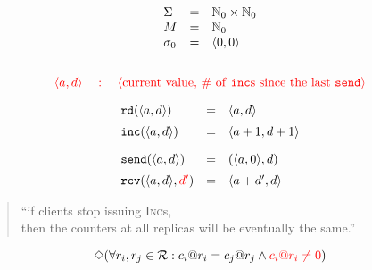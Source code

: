 
\begin{frame}{}
\end{frame}

\begin{frame}{}
  \[
    \begin{array}{lcl}
      \Sigma &=& \mathbb{N}_0 \times \mathbb{N}_0 \\
      M &=& \mathbb{N}_0 \\
      \sigma_0 &=& \langle 0,0 \rangle \\[10pt]
    \end{array}
  \]

  \pause
  \[
    \textcolor{red}{\langle a, d \rangle \quad:\quad \langle \text{current value, \# of \texttt{inc}{}s since the last \texttt{send}{}} \rangle}
  \]

  \pause
  \[
    \begin{array}{lcl}
      \texttt{rd}(\langle a, d \rangle) &=& \langle a, d \rangle \\[5pt]
      \texttt{inc}(\langle a, d \rangle) &=& \langle a+1, d+1 \rangle \\[10pt]
      \texttt{send}(\langle a, d \rangle) &=& (\langle a, 0 \rangle, d) \\[5pt]
      \texttt{rcv}(\langle a, d \rangle, \textcolor{red}{d'}) &=& \langle a+d', d \rangle
    \end{array}
  \]
\end{frame}

\begin{frame}{}
\end{frame}

\begin{frame}{}
  \centerline{\large {}}

  \vspace{0.60cm}
  \begin{quote}
    \begin{center}
      ``if clients stop issuing \textsc{Inc}s, \\
      then the counters at all replicas will be eventually the same.''
    \end{center}
  \end{quote}

  \pause
  \[
    \Diamond (\forall r_i, r_j \in \mathcal{R}: c_i@r_i = c_j@r_j \land \textcolor{red}{c_i@r_i \neq 0})
  \]
\end{frame}

